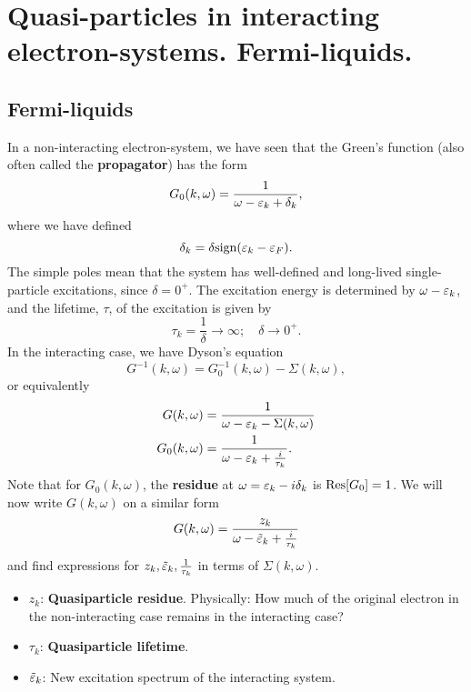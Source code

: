 \chapter{Quasi-particles in interacting electron-systems. Fermi-liquids.}

\section{Fermi-liquids}

In a non-interacting electron-system, we have seen that the Green's function (also often called the \textbf{propagator}) has the form 
\begin{equation} 
G_0(k,\omega) = \frac{1}{\omega-\varepsilon_k + \delta_k},
\end{equation}
where we have defined 
\begin{equation} 
\delta_k = \delta\text{sign}(\varepsilon_k-\varepsilon_F).
\end{equation}
The simple poles mean that the system has well-defined and long-lived single-particle excitations, since $\delta = 0^+$. The excitation energy is determined by $\omega-\varepsilon_k$, and the lifetime, $\tau$, of the excitation is given by 
\begin{equation} 
\tau_k =\frac{1}{\delta} \rightarrow \infty ; \quad \delta\rightarrow0^+.
\end{equation}
In the interacting case, we have Dyson's equation
\begin{equation} 
G^{-1}(k,\omega) = G_0^{-1}(k,\omega) - \Sigma(k,\omega),
\end{equation}
or equivalently
\begin{align} 
G(k,\omega) &= \frac{1}{\omega - \varepsilon_k - \Sigma(k,\omega)} \\
G_0(k,\omega) &= \frac{1}{\omega - \varepsilon_k+\frac{i}{\tau_k}}. 
\end{align}
Note that for $G_0(k,\omega)$, the \textbf{residue} at $\omega = \varepsilon_k-i\delta_k$ is $\Res[G_0] = 1$. 
We will now write $G(k, \omega)$ on a similar form 
\begin{equation} 
G(k,\omega) = \frac{z_k}{\omega-\tilde{\varepsilon}_k  + \frac{i}{\tau_k}}
\end{equation}
and find expressions for $z_k, \tilde{\varepsilon}_k, \frac{1}{\tau_k}$ in terms of $\Sigma(k,\omega)$. 
\begin{itemize}
	\item $z_k$: \textbf{Quasiparticle residue}. Physically: How much of the original electron in the non-interacting case remains in the interacting case?
	\item $\tau_k$: \textbf{Quasiparticle lifetime}. 
	\item $\tilde{\varepsilon}_k$: New excitation spectrum of the interacting system.
\end{itemize}

